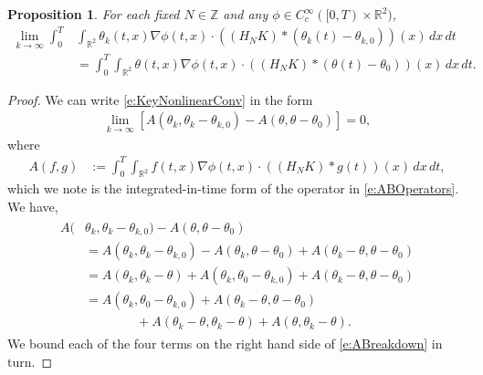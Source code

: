 \documentclass[11pt,reqno,xcolor=svgnames]{amsart}
\def\R{{\mathbb R}}
\def\Z{{\mathbb Z}}
\theoremstyle{plain}
\newtheorem{prop}[theorem]{Proposition}
\theoremstyle{definition}
\theoremstyle{plain}
\theoremstyle{remark}
\newcommand{\iny}{\ensuremath{\infty}}
\newcommand{\grad}{\ensuremath{\nabla}}
\newcommand{\brac}[1]{\ensuremath{\left[ #1 \right]}}
\begin{document}
    \begin{prop}\label{P:convergence2}
    For each fixed $N \in \Z$ and any $\phi \in C_c^\iny([0, T) \times \R^2)$,
    \begin{equation}\label{e:KeyNonlinearConv}
    \begin{split}
    \lim_{k\rightarrow\infty}
    	\int_0^T &\int_{\R^2} \theta_k(t, x)
        \nabla\phi(t,x) \cdot ((H_N K) *
        	(\theta_k(t) - \theta_{k,0}))(x)
            \, dx \, dt \\
        &= \int_0^T\int_{\R^2} \theta(t, x)
            \nabla\phi(t,x) \cdot ((H_N K) * (\theta(t) - \theta_0))(x)
            \, dx \, dt.
    \end{split}
    \end{equation}
    \end{prop} 
    \begin{proof}
    We can write \cref{e:KeyNonlinearConv} in the form
    \begin{align*}
    	\lim_{k \to \iny}
			\brac{A(\theta_k, \theta_k - \theta_{k, 0})
				- A(\theta, \theta - \theta_0)}
			= 0,
    \end{align*}
    where
    \begin{align*}
    	A(f, g)
			&:= \int_0^T \int_{\R^2} f(t, x)
    	    \grad \phi(t,x) \cdot ((H_N K) * g(t))(x)
        	    \, dx \, dt,
    \end{align*}
    which we note is the integrated-in-time form of the operator in \cref{e:ABOperators}. We have,
    \begin{align}\label{e:ABreakdown}
    	\begin{split}
    	A(&\theta_k, \theta_k - \theta_{k, 0})
				- A(\theta, \theta - \theta_0) \\
			&= A(\theta_k, \theta_k - \theta_{k, 0})
				- A(\theta_k, \theta - \theta_0)
				+ A(\theta_k - \theta, \theta - \theta_0) \\
			&= A(\theta_k, \theta_k - \theta)
				+ A(\theta_k, \theta_0 - \theta_{k, 0})
				+ A(\theta_k - \theta, \theta - \theta_0) \\
			&=  A(\theta_k, \theta_0 - \theta_{k, 0})
				+ A(\theta_k - \theta, \theta - \theta_0) \\
			&\qquad\qquad
				+ A(\theta_k - \theta, \theta_k - \theta)
                + A(\theta, \theta_k - \theta).
		\end{split}
    \end{align}
    We bound each of the four terms on the right hand side of 
    \cref{e:ABreakdown} in turn.
    

\end{proof}
\end{document}
